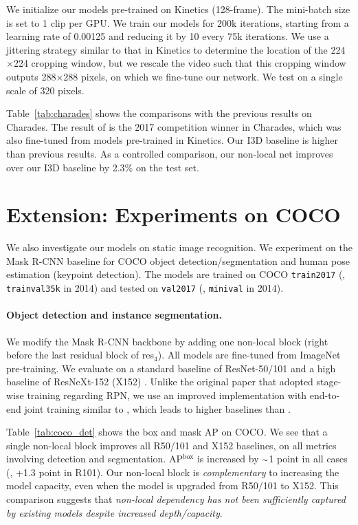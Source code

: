 \documentclass[10pt,twocolumn,letterpaper]{article}
\newcommand{\app}{\raise.17ex\hbox{$\scriptstyle\sim$}}
\def\x{$\times$}
\begin{document}
We initialize our models pre-trained on Kinetics (128-frame).
The mini-batch size is set to 1 clip per GPU. We train our models for 200k iterations, starting from a learning rate of 0.00125 and reducing it by 10 every 75k iterations.
We use a jittering strategy similar to that in Kinetics to determine the location of the 224\x224 cropping window, but we rescale the video such that this cropping window outputs 288\x288 pixels, on which we fine-tune our network.
We test on a single scale of 320 pixels.

Table~\ref{tab:charades} shows the comparisons with the previous results on Charades. The result of \cite{Carreira2017} is the 2017 competition winner in Charades, which was also fine-tuned from models pre-trained in Kinetics. Our I3D baseline is higher than previous results. As a controlled comparison, our non-local net improves over our I3D baseline by 2.3\% on the test set.

\vspace{-0.5em}
\section{Extension: Experiments on COCO}
\vspace{-0.5em}
We also investigate our models on static image recognition.
We experiment on the Mask R-CNN baseline \cite{He2017} for COCO \cite{Lin2014} object detection/segmentation and human pose estimation (keypoint detection). The models are trained on COCO \texttt{train2017} (\ie, \texttt{trainval35k} in 2014) and tested on \texttt{val2017} (\ie, \texttt{minival} in 2014).

\paragraph{Object detection and instance segmentation.}

We modify the Mask R-CNN backbone by adding one non-local block (right before the last residual block of res$_4$). All models are fine-tuned from ImageNet pre-training. We evaluate on a standard baseline of ResNet-50/101 and a high baseline of ResNeXt-152 (X152) \cite{Xie2017}. Unlike the original paper \cite{He2017} that adopted stage-wise training regarding RPN, we use an improved implementation with end-to-end joint training similar to \cite{Ren2017}, which leads to higher baselines than \cite{He2017}.

Table~\ref{tab:coco_det} shows the box and mask AP on COCO. We see that a single non-local block improves all R50/101 and X152 baselines, on all metrics involving detection and segmentation. AP$^\text{box}$ is increased by $\app$1 point in all cases (\eg, +1.3 point in R101). Our non-local block is \emph{complementary} to increasing the model capacity, even when the model is upgraded from R50/101 to X152. This comparison suggests that \emph{non-local dependency has not been sufficiently captured by existing models despite increased depth/capacity}.
\end{document}
